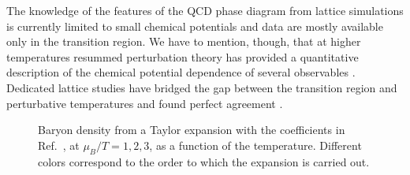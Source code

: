 \documentclass[aps,prd,twocolumn,superscriptaddress]{revtex4-2}
\begin{document}
The knowledge of the features of the QCD phase 
diagram from lattice simulations is currently limited
to small chemical potentials and data are mostly available
only in the transition region. We have to mention, though, that
at higher temperatures resummed perturbation theory has
provided a quantitative description of the chemical
potential dependence of several observables \cite{Mogliacci:2013mca,Haque:2013sja,Haque:2020eyj}.
Dedicated lattice studies have bridged the gap between
the transition region and perturbative temperatures and
found perfect agreement \cite{Bellwied:2015lba,Ding:2015fca}.


\begin{figure}[t]
\caption{Baryon density from a Taylor expansion with 
the coefficients in Ref.~\cite{Borsanyi:2018grb}, at 
$\mu_B/T = 1, 2, 3$, as a function of the temperature. Different colors correspond to the 
order to which the expansion is carried out.}
\label{fig:chiB1Taylor}
\end{figure}
\end{document}
